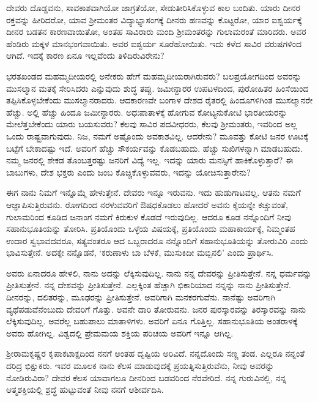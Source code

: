 ದೇವರು ದೊಡ್ಡವನು, ಸಾವಕಾಶವಾಗಿಯೋ ಜಾಗ್ರತೆಯೋ, ಸೇಡುತೀರಿಸಿಕೊಳ್ಳುವ ಕಾಲ ಬಂದಿತು. ಯಾರು ದೀನರ ರಕ್ತವನ್ನು ಹೀರಿದರೋ, ಯಾವ ಶ‍್ರೀಮಂತರ ವಿದ್ಯಾಭ್ಯಾಸಂಗಕ್ಕೆ ದೀನರು ಹಣವನ್ನು ಕೊಟ್ಟರೋ, ಯಾರ ಐಶ್ವರ್ಯಕ್ಕೆ ದೀನರ ಬಡತನ ಕಾರಣವಾಯಿತೋ, ಅಂತಹ ಸಾವಿರಾರು ಮಂದಿ ಶ‍್ರೀಮಂತರನ್ನು ಗುಲಾಮರಂತೆ ಮಾರಿದರು. ಅವರ ಹೆಂಡಿರು ಮಕ್ಕಳ ಮಾನಭಂಗವಾಯಿತು. ಅವರ ಐಶ್ವರ್ಯ ಸೂರೆಹೋಯಿತು. ಇದು ಕಳೆದ ಸಾವಿರ ವರುಷಗಳಿಂದ ಆಗಿದೆ. ಇದಕ್ಕೆ ಕಾರಣ ಏನೂ ಇಲ್ಲವೆಂದು ತಿಳಿದಿರುವಿರೇನು?

ಭರತಖಂಡದ ಮಹಮ್ಮದೀಯರಲ್ಲಿ ಅನೇಕರು ಹೇಗೆ ಮಹಮ್ಮದೀಯರಾಗಿರುವರು? ಬಲಪ್ರಯೋಗದಿಂದ ಅವರನ್ನು ಮುಸಲ್ಮಾನ ಮತಕ್ಕೆ ಸೇರಿಸಿದರು ಎನ್ನುವುದು ಶುದ್ಧ ತಪ್ಪು. ಜಮೀನ್ದಾರರ ಉಪಟಳದಿಂದ, ಪುರೋಹಿತರ ಹಿಂಸೆಯಿಂದ ತಪ್ಪಿಸಿಕೊಳ್ಳಬೇಕೆಂದು ಮುಸಲ್ಮಾನರಾದರು. ಆದಕಾರಣವೇ ಬಂಗಾಳ ದೇಶದ ರೈತರಲ್ಲಿ ಹಿಂದೂಗಳಿಗಿಂತ ಮುಸಲ್ಮಾನರೇ ಹೆಚ್ಚು. ಅಲ್ಲಿ ಹೆಚ್ಚು ಹಿಂದೂ ಜಮೀನ್ದಾರರು. ಅಧಃಪಾತಾಳಕ್ಕೆ ಹೋಗುವ ಕೋಟ್ಯನುಕೋಟಿ ಭಾರತೀಯರನ್ನು ಮೇಲೆತ್ತಬೇಕೆಂದು ಯಾರು ಬಯಸುವರು? ಕೆಲವು ಸಾವಿರ ಪದವೀಧರರು, ಕೆಲವು ಶ‍್ರೀಮಂತರು, ಇವರಿಂದ ಅಲ್ಲ ಒಂದು ರಾಷ್ಟ್ರವಾಗುವುದು. ನಿಜ, ನಮಗೆ ಅಷ್ಟೊಂದು ಅವಕಾಶವಿಲ್ಲ. ಆದರೇನು? ಮೂವತ್ತು ಕೋಟಿ ಜನರ ಊಟಕ್ಕೆ ಬಟ್ಟೆಗೆ ಬೇಕಾದಷ್ಟು ಇದೆ. ಅವರಿಗೆ ಹೆಚ್ಚು ಸೌಕರ್ಯವನ್ನು ಕೊಡಬಹುದು. ಹೆಚ್ಚು ಸುಖಿಗಳನ್ನಾಗಿ ಮಾಡಬಹುದು. ನಮ್ಮ ಜನರಲ್ಲಿ ಶೇಕಡ ತೊಂಬತ್ತರಷ್ಟು ಜನರಿಗೆ ವಿದ್ಯೆ ಇಲ್ಲ. ಇದನ್ನು ಯಾರು ಮನಸ್ಸಿಗೆ ಹಾಕಿಕೊಳ್ಳುತ್ತಾರೆ? ಈ ಬಾಬುಗಳು, ದೇಶ ಭಕ್ತರು ಎಂದು ಜಂಬ ಕೊಚ್ಚಿಕೊಳ್ಳುವವರು, ಇದನ್ನು ಯೋಚಿಸುತ್ತಾರೇನು?

ಈಗ ನಾನು ನಿಮಗೆ ಇನ್ನೊಮ್ಮೆ ಹೇಳುತ್ತೇನೆ. ದೇವರು ಇನ್ನೂ ಇರುವನು. ಇದು ಹುಡುಗಾಟವಲ್ಲ. ಆತನು ನಮಗೆ ಆಜ್ಞಾಪಿಸುತ್ತಿರುವನು. ರೋಗದಿಂದ ನರಳುವವರಿಗೆ ಔಷಧಕೊಡಲು ಹೋದರೆ ಅವನು ಕೈಯನ್ನೇ ಕಚ್ಚುವಂತೆ, ಗುಲಾಮರಿಂದ ಕೂಡಿದ ಜನಾಂಗ ನಮಗೆ ಕಿರುಕುಳ ಕೊಡದೆ ಇರುವುದಿಲ್ಲ. ಆದರೂ ಕೂಡ ನನ್ನೊಂದಿಗೆ ನೀವು ಸಹಾನುಭೂತಿಯನ್ನು ತೋರಿಸಿ. ಪ್ರತಿಯೊಂದು ಒಳ್ಳೆಯ ವಿಷಯಕ್ಕೆ, ಪ್ರತಿಯೊಂದು ಮಹಾಕಾರ್ಯಕ್ಕೆ, ನಿಮ್ಮಂತಹ ಉದಾರ ಸ್ವಭಾವದವರೂ, ಸತ್ಯವಂತರೂ ಆದ ಒಬ್ಬರಾದರೂ ನನ್ನೊಂದಿಗೆ ಸಹಾನುಭೂತಿಯನ್ನು ತೋರುವಿರಿ ಎಂದು ಭಾವಿಸುತ್ತೇನೆ. ಅದಕ್ಕೇ ನನ್ನೊಡನೆ, ‘ಕರುಣಾಳು ಬಾ ಬೆಳಕೆ, ಮುಸುಕಿದೀ ಮಬ್ಬಿನಲಿ’ ಎಂದು ಪ್ರಾರ್ಥಿಸಿ.

ಅವರು ಏನಾದರೂ ಹೇಳಲಿ, ನಾನು ಅದನ್ನು ಲೆಕ್ಕಿಸುವುದಿಲ್ಲ. ನಾನು ನನ್ನ ದೇವರನ್ನು ಪ್ರೀತಿಸುತ್ತೇನೆ. ನನ್ನ ಧರ್ಮವನ್ನು ಪ್ರೀತಿಸುತ್ತೇನೆ. ನನ್ನ ದೇಶವನ್ನು ಪ್ರೀತಿಸುತ್ತೇನೆ. ಎಲ್ಲಕ್ಕಿಂತ ಹೆಚ್ಚಾಗಿ ಭಿಕಾರಿಯಾದ ನನ್ನನ್ನು ನಾನು ಪ್ರೀತಿಸುತ್ತೇನೆ. ದೀನರನ್ನು, ದಲಿತರನ್ನು, ಮೂಢರನ್ನು ಪ್ರೀತಿಸುತ್ತೇನೆ. ಅವರಿಗಾಗಿ ಮನಕರಗುವೆನು. ನಾನೆಷ್ಟು ಅವರಿಗಾಗಿ ವ್ಯಥೆಪಡುವೆನೆಂಬುದು ದೇವರಿಗೆ ಗೊತ್ತು. ಅವನೇ ದಾರಿ ತೋರುವನು. ಜನರ ಪುರಸ್ಕಾರವನ್ನು ತಿರಸ್ಕಾರವನ್ನು ನಾನು ಲೆಕ್ಕಿಸುವುದಿಲ್ಲ. ಅವರೆಲ್ಲ ಬಹುಪಾಲು ಮಾತಾಳಿಗಳು. ಅವರಿಗೆ ಏನೂ ಗೊತ್ತಿಲ್ಲ. ಸಹಾನುಭೂತಿಯ ಅಂತರಾಳಕ್ಕೆ ಅವರು ಹೋಗಿಲ್ಲ. ವಿಶ್ವದಲ್ಲಿ ಪ್ರೇಮಮಯ ಶಕ್ತಿಯ ಪರಿಚಯ ಅವರಿಗೆ ಇನ್ನೂ ಆಗಿಲ್ಲ.

ಶ‍್ರೀರಾಮಕೃಷ್ಣರ ಕೃಪಾಕಟಾಕ್ಷದಿಂದ ನನಗೆ ಅಂತಹ ದೃಷ್ಟಿಯ ಅರಿವಿದೆ. ನನ್ನದೊಂದು ಸಣ್ಣ ತಂಡ. ಎಲ್ಲರೂ ನನ್ನಂತೆ ದರಿದ್ರ ಭಿಕ್ಷುಕರು. ಇವರ ಮೂಲಕ ನಾನು ಕೆಲಸ ಮಾಡುವುದಕ್ಕೆ ಪ್ರಯತ್ನಿಸುತ್ತಿರುವೆನು, ನೀವು ಅವರನ್ನು ನೋಡಿರುವಿರಾ? ದೇವರ ಕೆಲಸ ಯಾವಾಗಲೂ ದೀನರಿಂದ ಬಡವರಿಂದ ನೆರವೇರಿದೆ. ನನ್ನ ಗುರುವಿನಲ್ಲಿ, ನನ್ನ ಆತ್ಮಶಕ್ತಿಯಲ್ಲಿ ಶ್ರದ್ಧೆ ಹುಟ್ಟುವಂತೆ ನೀವು ನನಗೆ ಆಶೀರ್ವದಿಸಿ.

